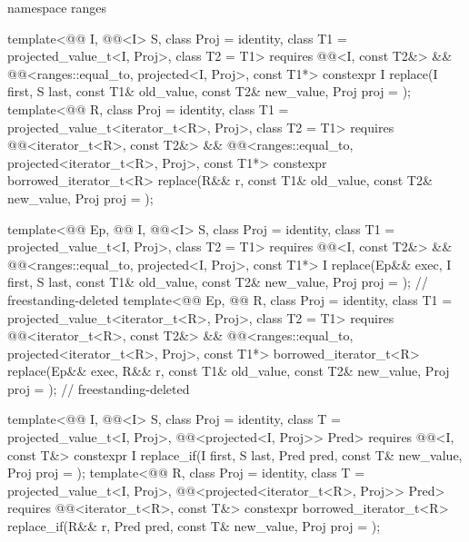 \begin{codeblock}
{  namespace ranges {
    template<@@ I, @@<I> S, class Proj = identity,
             class T1 = projected_value_t<I, Proj>, class T2 = T1>
      requires @@<I, const T2&> &&
               @@<ranges::equal_to, projected<I, Proj>, const T1*>
      constexpr I
        replace(I first, S last, const T1& old_value, const T2& new_value, Proj proj = {});
    template<@@ R, class Proj = identity,
             class T1 = projected_value_t<iterator_t<R>, Proj>, class T2 = T1>
      requires @@<iterator_t<R>, const T2&> &&
               @@<ranges::equal_to,
                                         projected<iterator_t<R>, Proj>, const T1*>
      constexpr borrowed_iterator_t<R>
        replace(R&& r, const T1& old_value, const T2& new_value, Proj proj = {});

    template<@@ Ep, @@ I, @@<I> S,
             class Proj = identity, class T1 = projected_value_t<I, Proj>, class T2 = T1>
      requires @@<I, const T2&> &&
               @@<ranges::equal_to, projected<I, Proj>, const T1*>
      I replace(Ep&& exec, I first, S last,
                const T1& old_value, const T2& new_value, Proj proj = {});  // freestanding-deleted
    template<@@ Ep, @@ R, class Proj = identity,
             class T1 = projected_value_t<iterator_t<R>, Proj>, class T2 = T1>
      requires @@<iterator_t<R>, const T2&> &&
               @@<ranges::equal_to,
                                         projected<iterator_t<R>, Proj>, const T1*>
      borrowed_iterator_t<R>
        replace(Ep&& exec, R&& r, const T1& old_value, const T2& new_value,
                Proj proj = {});                                            // freestanding-deleted

    template<@@ I, @@<I> S, class Proj = identity,
             class T = projected_value_t<I, Proj>,
             @@<projected<I, Proj>> Pred>
      requires @@<I, const T&>
      constexpr I replace_if(I first, S last, Pred pred, const T& new_value, Proj proj = {});
    template<@@ R, class Proj = identity, class T = projected_value_t<I, Proj>,
             @@<projected<iterator_t<R>, Proj>> Pred>
      requires @@<iterator_t<R>, const T&>
      constexpr borrowed_iterator_t<R>
        replace_if(R&& r, Pred pred, const T& new_value, Proj proj = {});

}}
\end{codeblock}
